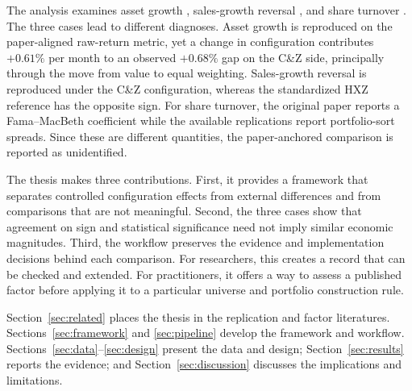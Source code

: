 The analysis examines asset growth \citep{CooperGulenSchill2008},
sales-growth reversal \citep{LakonishokShleiferVishny1994}, and share turnover
\citep{DatarNaikRadcliffe1998}. The three cases lead to different diagnoses.
Asset growth is reproduced on the paper-aligned raw-return metric, yet a
change in configuration contributes $+0.61\%$ per month to an observed
$+0.68\%$ gap on the C\&Z side, principally through the move from value to
equal weighting. Sales-growth reversal is reproduced under the C\&Z
configuration, whereas the standardized HXZ reference has the opposite sign.
For share turnover, the original paper reports a Fama--MacBeth coefficient
while the available replications report portfolio-sort spreads. Since these
are different quantities, the paper-anchored comparison is reported as
unidentified.

The thesis makes three contributions. First, it provides a framework that
separates controlled configuration effects from external differences and from
comparisons that are not meaningful. Second, the three cases show that
agreement on sign and statistical significance need not imply similar economic
magnitudes. Third, the workflow preserves the evidence and implementation
decisions behind each comparison. For researchers, this creates a record that
can be checked and extended. For practitioners, it offers a way to assess a
published factor before applying it to a particular universe and portfolio
construction rule.

Section~\ref{sec:related} places the thesis in the replication and factor
literatures. Sections~\ref{sec:framework} and \ref{sec:pipeline} develop the
framework and workflow. Sections~\ref{sec:data}--\ref{sec:design} present the
data and design; Section~\ref{sec:results} reports the evidence; and
Section~\ref{sec:discussion} discusses the implications and limitations.

